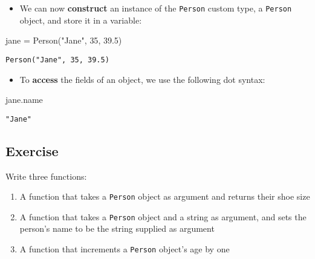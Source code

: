 \documentclass[
  letterpaper,
  DIV=11,
  numbers=noendperiod]{scrartcl}
\newenvironment{Shaded}{\begin{snugshade}}{\end{snugshade}}
\newcommand{\FloatTok}[1]{\textcolor[rgb]{0.68,0.00,0.00}{#1}}
\newcommand{\FunctionTok}[1]{\textcolor[rgb]{0.28,0.35,0.67}{#1}}
\newcommand{\NormalTok}[1]{\textcolor[rgb]{0.00,0.23,0.31}{#1}}
\newcommand{\OperatorTok}[1]{\textcolor[rgb]{0.37,0.37,0.37}{#1}}
\newcommand{\StringTok}[1]{\textcolor[rgb]{0.13,0.47,0.30}{#1}}
\providecommand{\tightlist}{%
  \setlength{\itemsep}{0pt}\setlength{\parskip}{0pt}}\usepackage{longtable,booktabs,array}
\begin{document}
\begin{itemize}
\tightlist
\item
  We can now \textbf{construct} an instance of the \texttt{Person}
  custom type, a \texttt{Person} object, and store it in a variable:
\end{itemize}

\begin{Shaded}
\begin{Highlighting}[]
\NormalTok{jane }\OperatorTok{=} \FunctionTok{Person}\NormalTok{(}\StringTok{"Jane"}\NormalTok{, }\FloatTok{35}\NormalTok{, }\FloatTok{39.5}\NormalTok{)}
\end{Highlighting}
\end{Shaded}

\begin{verbatim}
Person("Jane", 35, 39.5)
\end{verbatim}

\begin{itemize}
\tightlist
\item
  To \textbf{access} the fields of an object, we use the following dot
  syntax:
\end{itemize}

\begin{Shaded}
\begin{Highlighting}[]
\NormalTok{jane.name}
\end{Highlighting}
\end{Shaded}

\begin{verbatim}
"Jane"
\end{verbatim}

\subsection{Exercise}\label{exercise-2}

Write three functions:

\begin{enumerate}
\def\labelenumi{\arabic{enumi}.}
\tightlist
\item
  A function that takes a \texttt{Person} object as argument and returns
  their shoe size
\item
  A function that takes a \texttt{Person} object and a string as
  argument, and sets the person's name to be the string supplied as
  argument
\item
  A function that increments a \texttt{Person} object's age by one
\end{enumerate}
\end{document}
